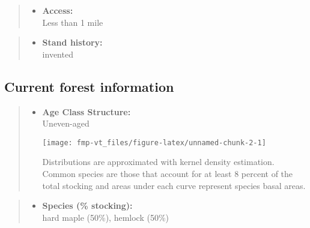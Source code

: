 \documentclass[]{tufte-handout}
\providecommand{\tightlist}{%
  \setlength{\itemsep}{0pt}\setlength{\parskip}{0pt}}
\begin{document}
\begin{quote}
\begin{itemize}
\tightlist
\item
  \textbf{Access:}\\
  \vspace{2pt} Less than 1 mile
\end{itemize}
\end{quote}

\begin{quote}
\begin{itemize}
\tightlist
\item
  \textbf{Stand history:}\\
  \vspace{2pt} invented
\end{itemize}
\end{quote}

\subsection{Current forest
information}\label{current-forest-information}

\begin{quote}
\begin{itemize}
\tightlist
\item
  \textbf{Age Class Structure:}\\
  \vspace{2pt} Uneven-aged\\

  \begin{marginfigure}
  \texttt{[image: fmp-vt\_files/figure-latex/unnamed-chunk-2-1]} \caption[Distributions are approximated with kernel density estimation]{Distributions are approximated with kernel density estimation. Common species are those that account for at least 8 percent of the total stocking and areas under each curve represent species basal areas.}\label{fig:unnamed-chunk-2}
  \end{marginfigure}
\end{itemize}
\end{quote}

\begin{quote}
\begin{itemize}
\tightlist
\item
  \textbf{Species (\% stocking):}\\
  \vspace{2pt} hard maple (50\%), hemlock (50\%)
\end{itemize}
\end{quote}
\end{document}
